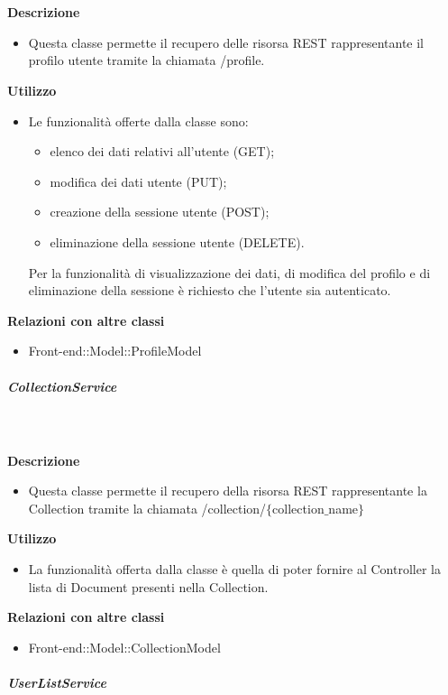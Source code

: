 				\textbf{\\ \\ Descrizione} 
					\begin{itemize}
						\item[] Questa classe permette il recupero delle risorsa REST rappresentante il profilo utente tramite la chiamata /profile.
					\end{itemize}      
				\textbf{Utilizzo}  
					\begin{itemize}
						\item[] Le funzionalità offerte dalla classe sono:
\begin{itemize}
\item elenco dei dati relativi all'utente (GET);
\item modifica dei dati utente (PUT);
\item creazione della sessione utente (POST);
\item eliminazione della sessione utente (DELETE).
\end{itemize}

Per la funzionalità di visualizzazione dei dati, di modifica del profilo e di eliminazione della sessione è richiesto che l'utente sia autenticato.
					\end{itemize}
					\textbf{Relazioni con altre classi}
					\begin{itemize}
							\item{Front-end::Model::ProfileModel}
					\end{itemize}
			\subparagraph{CollectionService}
				
				\textbf{\\ \\ Descrizione} 
					\begin{itemize}
						\item[] Questa classe permette il recupero della risorsa REST rappresentante la Collection tramite la chiamata  /collection/$\{$collection$\_$name$\}$
					\end{itemize}      
				\textbf{Utilizzo}  
					\begin{itemize}
						\item[] La  funzionalità offerta dalla classe è quella di poter fornire al Controller la lista di Document presenti nella Collection.
					\end{itemize}
					\textbf{Relazioni con altre classi}
					\begin{itemize}
							\item{Front-end::Model::CollectionModel}
					\end{itemize}
			\subparagraph{UserListService}
				
